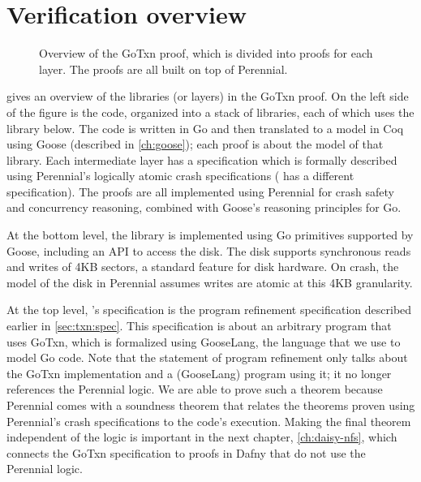 \section{Verification overview}%
\label{sec:txn:overview}

\begin{figure}
  \caption{Overview of the GoTxn proof, which is divided into proofs for each
    layer. The proofs are all built on top of Perennial.}
  \label{fig:txn:proof-overview}
\end{figure}

 gives an overview of the libraries (or layers) in
the GoTxn proof. On the left side of the figure is the code, organized into a
stack of libraries, each of which uses the library below. The code is written in
Go and then translated to a model in Coq using Goose (described in
\cref{ch:goose}); each proof is about the model of that library. Each
intermediate layer has a specification which is formally described using
Perennial's logically atomic crash specifications ( has a different
specification). The proofs are all implemented using Perennial for crash safety
and concurrency reasoning, combined with Goose's reasoning principles for Go.

At the bottom level, the  library is implemented using Go primitives
supported by Goose, including an API to access the disk. The disk supports
synchronous reads and writes of 4KB sectors, a standard feature for disk
hardware. On crash, the model of the disk in Perennial assumes writes are atomic
at this 4KB granularity.

At the top level, 's specification is the program refinement
specification described earlier in \cref{sec:txn:spec}. This specification is
about an arbitrary program that uses GoTxn, which is formalized using GooseLang,
the language that we use to model Go code. Note that the statement of program
refinement only talks about the GoTxn implementation and a (GooseLang) program
using it; it no longer references the Perennial logic. We are able to prove such
a theorem because Perennial comes with a soundness theorem that relates the
theorems proven using Perennial's crash specifications to the code's execution.
Making the final theorem independent of the logic is important in the next
chapter, \cref{ch:daisy-nfs}, which connects the GoTxn specification to proofs
in Dafny that do not use the Perennial logic.
